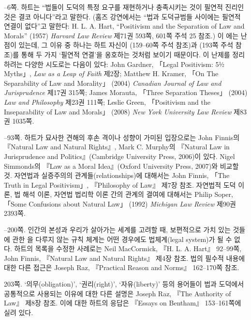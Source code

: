{--6쪽.  하트는 “법들이 도덕의 특정 요구를 재현하거나 충족시키는 것이
필연적 진리인 것은 결코 아니다”라고 말한다. (홈즈 강연에서는 “법과
도덕규범들 사이에는 필연적 연결이 없다”고 말한다: H. L. A. Hart,
“Positivism and the Separation of Law and Morals” (1957) \emph{Harvard
Law Review} 제71권 593쪽, 601쪽 주석 25 참조.) 이 에는 난점이 있는데, 그 이유 중 하나는 하트
자신이 (159--60쪽 주석 참조)과
(193쪽 주석 참조)를
통해 두 가지 ‘필연적 연결’을 옹호하는 것처럼 보이기 때문이다. 이 난제를
정리하려는 다양한 시도로는 다음이 있다: John Gardner, 「Legal
Positivism: 5½ Myths」, \emph{Law as a Leap of Faith} 제2장; Matthew H.
Kramer, 「On The Separability of Law and Morality」 (2004)
\emph{Canadian Journal of Law and Jurisprudence} 제17권 315쪽; James
Morauta, 「Three Separation Theses」 (2004) \emph{Law and Philosophy}
제23권 111쪽; Leslie Green, 「Positivism and the Inseparability of Law
and Morals」 (2008) \emph{New York University Law Review} 제83권 1035쪽.

--93쪽.  하트가 묘사한 견해의 후손 격이나
 성향이 가미된
입장으로는 John Finnis의 『Natural Law and Natural Rights』, Mark C.
Murphy의 『Natural Law in Jurisprudence and Politics』(Cambridge
University Press, 2006)이 있다. Nigel Simmonds의 『Law as a Moral
Idea』(Oxford University Press, 2007)와 비교할 것. 자연법과 실증주의의
관계들(relationships)에 대해서는 John Finnis, 「The Truth in Legal
Positivism」, 『Philosophy of Law』 제7장 참조. 자연법적 도덕 이론, 법
해석 이론, 자연법 법리학 이론 간의 관계의 결여에 대해서는 Philip Soper,
「Some Confusions about Natural Law」 (1992) \emph{Michigan Law Review}
제90권 2393쪽.

--200쪽.  인간의 본성과 우리가 살아가는 세계를 고려할 때, 보편적으로 가치 있는
것들에 관한 을 다루지 않는 규칙
체계는 어떤 경우에도 법체계(legal system)가 될 수 없다. 하트의 목록을
수정한 사례로는 Neil MacCormick, 『H. L. A. Hart』 92--99쪽, John
Finnis, 『Natural Law and Natural Rights』 제4장 참조. 법의 필수적
내용에 대한 다른 접근은 Joseph Raz, 『Practical Reason and Norms』
162--170쪽 참조.

\noteentry 203쪽.  ‘의무(obligation)’, ‘권리(right)’, ‘자유(liberty)’ 등의
용어들이 법과 도덕에서 공통적으로 사용되는 이유에 대한 다른 설명은
Joseph Raz, 『The Authority of Law』 제8장 참조. 이에 대한 하트의 응답은
『Essays on Bentham』 153--161쪽에 실려 있다.

}
